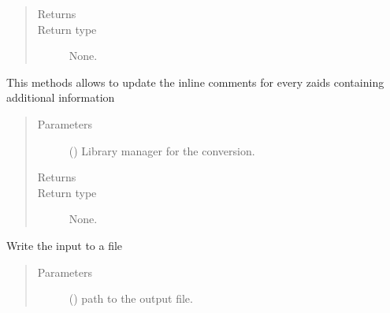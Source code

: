 \documentclass[letterpaper,10pt,english]{sphinxmanual}
\begin{document}
\begin{fulllineitems}
\begin{fulllineitems}
\begin{quote}
\begin{description}
\begin{itemize}
\end{itemize}

\item[{Returns}] \leavevmode


\item[{Return type}] \leavevmode
None.

\end{description}\end{quote}

\end{fulllineitems}


\begin{fulllineitems}
\label{\detokenize{api/inputgeneration:inputfile.InputFile.update_zaidinfo}}
This methods allows to update the in\sphinxhyphen{}line comments for every zaids
containing additional information
\begin{quote}\begin{description}
\item[{Parameters}] \leavevmode
{} ({\hyperref[\detokenize{api/initobjects:libmanager.LibManager}]{}}) \textendash{} Library manager for the conversion.

\item[{Returns}] \leavevmode


\item[{Return type}] \leavevmode
None.

\end{description}\end{quote}

\end{fulllineitems}


\begin{fulllineitems}
\label{\detokenize{api/inputgeneration:inputfile.InputFile.write}}
Write the input to a file
\begin{quote}\begin{description}
\item[{Parameters}] \leavevmode
{} () \textendash{} path to the output file.


\end{description}
\end{quote}
\end{fulllineitems}
\end{fulllineitems}
\end{document}
